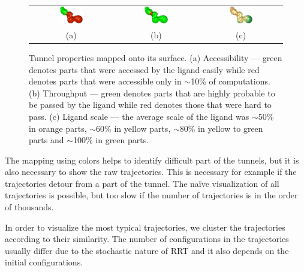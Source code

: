 \documentclass{svmult}
\newcommand{\tylde}{$\sim$}
\begin{document}
\begin{figure}
\centering
\begin{tabular}{ccc}
\includegraphics[width=0.3\textwidth]{fig/accessibility} &
\includegraphics[width=0.3\textwidth]{fig/throughput} &
\includegraphics[width=0.3\textwidth]{fig/ligand-scale} \\
  (a) & (b) & (c) \\                     
\end{tabular}
\caption{Tunnel properties mapped onto its surface.
(a) Accessibility --- green denotes parts that were accessed by the ligand easily while red denotes parts that were accessible only in \tylde 10\% of computations.
(b) Throughput --- green denotes parts that are highly probable to be passed by the ligand while red denotes those that were hard to pass.
(c) Ligand scale --- the average scale of the ligand was \tylde 50\% in orange parts, \tylde 60\% in yellow parts, \tylde 80\% in yellow to green parts and \tylde 100\% in green parts.
\label{fig:properties}
}
\end{figure}

The mapping using colors helps to identify difficult part of the tunnels, but it is also necessary to show the raw trajectories.
This is necessary for example if the trajectories detour from a part of the tunnel.
The na\"{i}ve visualization of all trajectories is possible, but too slow if the number of trajectories is in the order of thousands.

In order to visualize the most typical trajectories, we cluster the trajectories according to their similarity.
The number of configurations in the trajectories usually differ due to the stochastic nature of RRT and it also depends on the
initial configurations.
\end{document}
